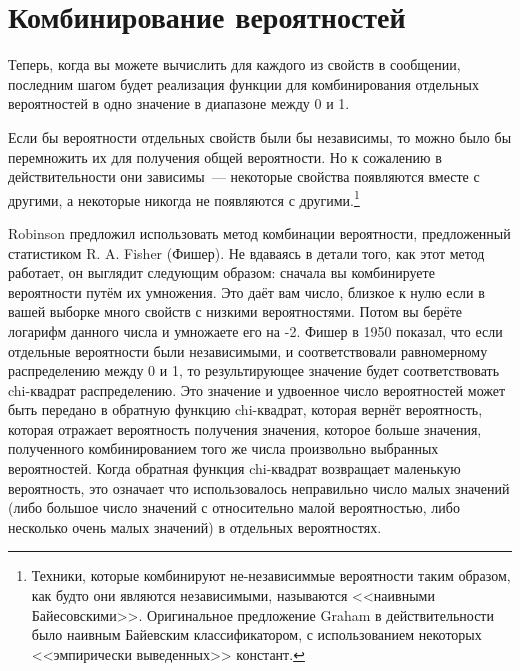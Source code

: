 \section{Комбинирование вероятностей}

Теперь, когда вы можете вычислить  для каждого из свойств
в сообщении, последним шагом будет реализация функции  для комбинирования
отдельных вероятностей в одно значение в диапазоне между 0 и 1.

Если бы вероятности отдельных свойств были бы независимы, то можно было бы перемножить их
для получения общей вероятности.  Но к сожалению в действительности они зависимы~---
некоторые свойства появляются вместе с другими, а некоторые никогда не появляются с
другими.\footnote{Техники, которые комбинируют не-независиммые вероятности таким образом,
  как будто они являются независимыми, называются <<наивными Байесовскими>>.  Оригинальное
  предложение Graham в действительности было наивным Байевским классификатором, с
  использованием некоторых <<эмпирически выведенных>> констант.}

Robinson предложил использовать метод комбинации вероятности, предложенный статистиком
R. A. Fisher (Фишер).  Не вдаваясь в детали того, как этот метод работает, он выглядит
следующим образом: сначала вы комбинируете вероятности путём их умножения.  Это даёт вам
число, близкое к нулю если в вашей выборке много свойств с низкими вероятностями.  Потом
вы берёте логарифм данного числа и умножаете его на -2.  Фишер в 1950 показал, что если
отдельные вероятности были независимыми, и соответствовали равномерному распределению
между 0 и 1, то результирующее значение будет соответствовать chi-квадрат
распределению. Это значение и удвоенное число вероятностей может быть передано в обратную
функцию chi-квадрат, которая вернёт вероятность, которая отражает вероятность получения
значения, которое больше значения, полученного комбинированием того же числа произвольно
выбранных вероятностей.  Когда обратная функция chi-квадрат возвращает маленькую
вероятность, это означает что использовалось неправильно число малых значений (либо
большое число значений с относительно малой вероятностью, либо несколько очень малых
значений) в отдельных вероятностях.

